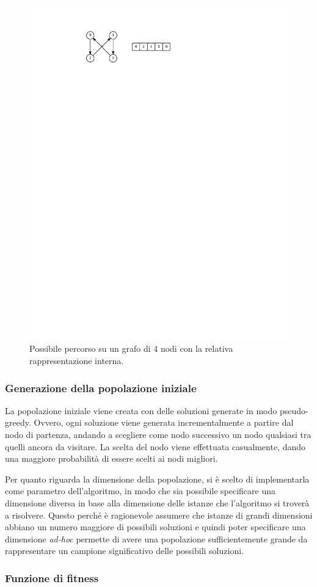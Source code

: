 \begin{figure}[htbp]
	\centering
	\includegraphics[width=.6\textwidth]{immagini/path-rappr.pdf}
	\caption{Possibile percorso su un grafo di 4 nodi con la relativa rappresentazione interna.}\label{fig:rappr}
\end{figure}

\subsubsection{Generazione della popolazione iniziale}

La popolazione iniziale viene creata con delle soluzioni generate in modo pseudo-greedy.
Ovvero, ogni soluzione viene generata incrementalmente a partire dal nodo di partenza, andando a scegliere come nodo successivo un nodo qualsiasi tra quelli ancora da visitare.
La scelta del nodo viene effettuata casualmente, dando una maggiore probabilità di essere scelti ai nodi migliori.

Per quanto riguarda la dimensione della popolazione, si è scelto di implementarla come parametro dell'algoritmo, in modo che sia possibile specificare una dimensione diversa in base alla dimensione delle istanze che l'algoritmo si troverà a risolvere.
Questo perché è ragionevole assumere che istanze di grandi dimensioni abbiano un numero maggiore di possibili soluzioni e quindi poter specificare una dimensione \textit{ad-hoc} permette di avere una popolazione sufficientemente grande da rappresentare un campione significativo delle possibili soluzioni.

\subsubsection{Funzione di fitness}


